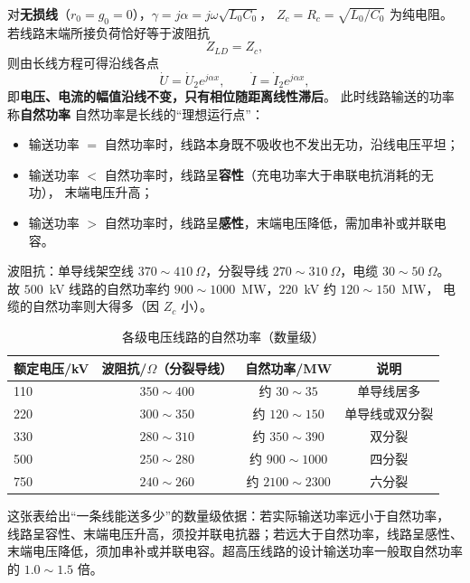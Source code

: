 对\textbf{无损线}（$r_0=g_0=0$），$\gamma=j\alpha=j\omega\sqrt{L_0C_0}$，
$Z_c=R_c=\sqrt{L_0/C_0}$ 为纯电阻。若线路末端所接负荷恰好等于波阻抗
\begin{equation}
  Z_{LD}=Z_c ,
\end{equation}
则由长线方程可得沿线各点
\begin{equation}
  \dot U=\dot U_2e^{j\alpha x},\qquad \dot I=\dot I_2e^{j\alpha x},
\end{equation}
即\textbf{电压、电流的幅值沿线不变，只有相位随距离线性滞后}。
此时线路输送的功率称\textbf{自然功率}
自然功率是长线的“理想运行点”：
\begin{itemize}
  \item 输送功率 $=$ 自然功率时，线路本身既不吸收也不发出无功，沿线电压平坦；
  \item 输送功率 $<$ 自然功率时，线路呈\textbf{容性}（充电功率大于串联电抗消耗的无功），
        末端电压升高；
  \item 输送功率 $>$ 自然功率时，线路呈\textbf{感性}，末端电压降低，需加串补或并联电容。
\end{itemize}
波阻抗：单导线架空线 $370\sim410\ \Omega$，分裂导线 $270\sim310\ \Omega$，电缆 $30\sim50\ \Omega$。
故 $500$~kV 线路的自然功率约 $900\sim1000$~MW，$220$~kV 约 $120\sim150$~MW，
电缆的自然功率则大得多（因 $Z_c$ 小）。

\begin{table}[htbp]
  \centering
  \caption{各级电压线路的自然功率（数量级）}
  \small
  \begin{tabular}{@{}lccc@{}}
    \toprule
    额定电压/kV & 波阻抗/$\Omega$（分裂导线） & 自然功率/MW & 说明 \\
    \midrule
    110 & $350\sim400$ & 约 $30\sim35$ & 单导线居多 \\
    220 & $300\sim350$ & 约 $120\sim150$ & 单导线或双分裂 \\
    330 & $280\sim310$ & 约 $350\sim390$ & 双分裂 \\
    500 & $250\sim280$ & 约 $900\sim1000$ & 四分裂 \\
    750 & $240\sim260$ & 约 $2100\sim2300$ & 六分裂 \\
    \bottomrule
  \end{tabular}
\end{table}

这张表给出“一条线能送多少”的数量级依据：若实际输送功率远小于自然功率，
线路呈容性、末端电压升高，须投并联电抗器；若远大于自然功率，线路呈感性、
末端电压降低，须加串补或并联电容。超高压线路的设计输送功率一般取自然功率的
$1.0\sim1.5$ 倍。

